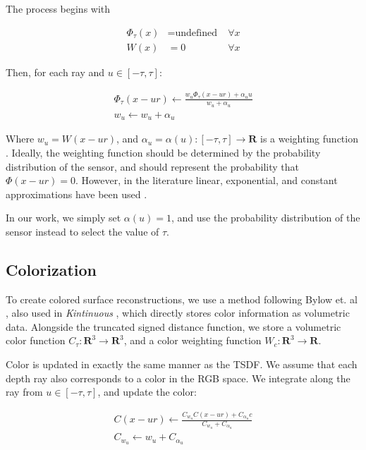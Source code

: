 \documentclass[conference,10pt]{IEEEtran}
\begin{document}
The process begins with 

\begin{align*}
\Phi_{\tau}(x)& = \text{undefined} \;&\forall x  \\
%
 W(x)&= 0 \; &\forall x 
\end{align*}

Then, for each ray and $u\in[-\tau, \tau]$:

\begin{subequations}
\begin{align}
\Phi_{\tau}(x - ur) \gets \frac{w_u \Phi_{\tau}(x - ur) + \alpha_u u}{w_u
+\alpha_u}
\\
%
w_u \gets w_u+ \alpha _u
\end{align}
\label{eqn:update}
\end{subequations}

\noindent Where  $w_u = W(x - ur)$, and $\alpha_u  = \alpha(u) : [-\tau,\tau]\to
\mathbf{R} $ is a weighting function . Ideally, the weighting function should be
determined by the probability distribution of the sensor, and should represent
the probability that $\Phi(x - ur) = 0$. However, in the literature linear,
exponential, and constant approximations have been used \cite{Curless1996,
Newcombe, Whelan2013, Bylow2013}. 

In our work, we simply set $\alpha(u) = 1$, and use the probability distribution
of the sensor instead to select the value of $\tau$.

\subsection{Colorization}
To create colored surface reconstructions, we use a method following Bylow et.
al \cite{Bylow2013}, also used in \textit{Kintinuous} \cite{Whelan2013}, which
directly stores color information as volumetric data. Alongside the
truncated signed distance function, we store a volumetric color function
$C_\tau : \mathbf{R}^3 \to \mathbf{R}^3$, and a color weighting function $W_c :
\mathbf{R}^3 \to \mathbf{R}$.

Color is updated in exactly the same manner as the TSDF. We assume that each
depth ray also corresponds to a color in the RGB space. We integrate along the
ray from $u \in [-\tau, \tau]$, and update the color:

\begin{align*}
C(x - ur) \gets \frac{C_{w_u} C(x - ur) + C_\alpha_u c}{C_{w_u}
+C_{\alpha_u}}
\\
%
C_{w_u} \gets w_u+ C_{\alpha_u}
\end{align*}
\end{document}
